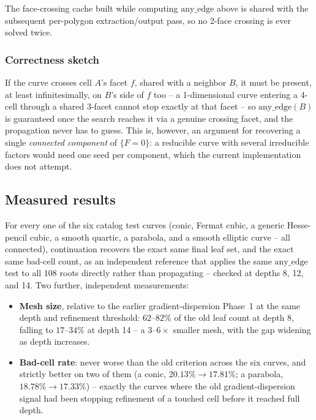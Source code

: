 \documentclass[11pt]{article}
\begin{document}
The face-crossing cache built while computing $\mathrm{any\_edge}$ above is
shared with the subsequent per-polygon extraction/output pass, so no
2-face crossing is ever solved twice.

\subsubsection*{Correctness sketch}

If the curve crosses cell $A$'s facet $f$, shared with a neighbor $B$, it
must be present, at least infinitesimally, on $B$'s side of $f$ too -- a
1-dimensional curve entering a 4-cell through a shared 3-facet cannot stop
exactly at that facet -- so $\mathrm{any\_edge}(B)$ is guaranteed once the
search reaches it via a genuine crossing facet, and the propagation never
has to guess. This is, however, an argument for recovering a single
\emph{connected component} of $\{F=0\}$: a reducible curve with several
irreducible factors would need one seed per component, which the current
implementation does not attempt.

\subsection{Measured results}

For every one of the six catalog test curves (conic, Fermat cubic, a
generic Hesse-pencil cubic, a smooth quartic, a parabola, and a smooth
elliptic curve -- all connected), continuation recovers the exact same
final leaf set, and the exact same bad-cell count, as an independent
reference that applies the same $\mathrm{any\_edge}$ test to all 108 roots
directly rather than propagating -- checked at depths 8, 12, and 14. Two
further, independent measurements:

\begin{itemize}
\item \textbf{Mesh size}, relative to the earlier gradient-dispersion
  Phase~1 at the same depth and refinement threshold: $62$--$82\%$ of the
  old leaf count at depth 8, falling to $17$--$34\%$ at depth 14 -- a
  $3$--$6\times$ smaller mesh, with the gap widening as depth increases.
\item \textbf{Bad-cell rate}: never worse than the old criterion across
  the six curves, and strictly better on two of them (a conic, $20.13\%
  \to17.81\%$; a parabola, $18.78\%\to17.33\%$) -- exactly the curves
  where the old gradient-dispersion signal had been stopping refinement of
  a touched cell before it reached full depth.
\end{itemize}
\end{document}

